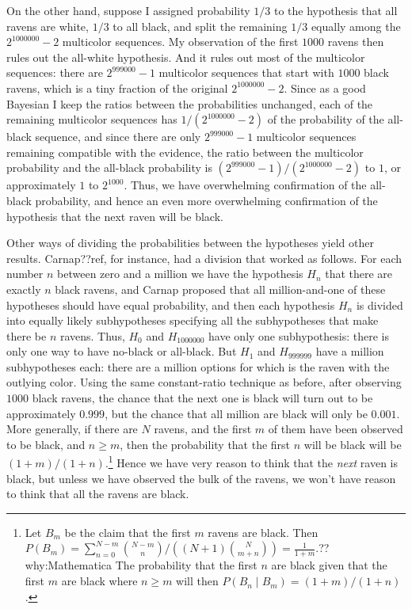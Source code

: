 On the other hand, suppose I assigned probability $1/3$ to the hypothesis that all ravens are white, $1/3$ to all black,
and split the remaining $1/3$ equally among the $2^{1000000}-2$ multicolor sequences. My observation of the first $1000$
ravens then rules out the all-white  hypothesis. And it rules out most of the multicolor sequences: there are $2^{999000}-1$
multicolor sequences that start with $1000$ black ravens, which is a tiny fraction of the original $2^{1000000}-2$. Since as a 
good Bayesian I keep the ratios between the probabilities unchanged, each of the remaining multicolor sequences has 
$1/(2^{1000000}-2)$ of the probability of the all-black sequence, and since there are only $2^{999000}-1$ multicolor
sequences remaining compatible with the evidence, the ratio between the multicolor probability and the all-black probability
is $(2^{999000}-1)/(2^{1000000}-2)$ to $1$, or approximately $1$ to $2^{1000}$. Thus, we have overwhelming confirmation of 
the all-black probability, and hence an even more overwhelming confirmation of the hypothesis that the next raven will be black.

Other ways of dividing the probabilities between the hypotheses yield other results. Carnap??ref, for instance, had a division
that worked as follows. For each number $n$ between zero and a million we have the hypothesis $H_n$ that there are exactly 
$n$ black ravens, and Carnap proposed that all million-and-one of these hypotheses should have equal probability, and then 
each hypothesis $H_n$ is divided into equally likely subhypotheses specifying all the subhypotheses that make there be $n$
ravens. Thus, $H_0$ and $H_{1000000}$ have only one subhypothesis: there is only one way to have no-black or all-black. But
$H_1$ and $H_{999999}$ have a million subhypotheses each: there are a million options for which is the raven with the outlying
color. Using the same constant-ratio technique as before, after observing $1000$ black ravens, the chance that the next one is black 
will turn out to be approximately $0.999$, but the chance that all million are black will only be $0.001$. More generally, if there
are $N$ ravens, and the first $m$ of them have been observed to be black, and $n\ge m$, then the probability that the first $n$
will be black will be $(1+m)/(1+n)$.\footnote{Let $B_m$ be the claim that the first $m$ ravens are black. Then
$P(B_m)=\sum_{n=0}^{N-m} {{N-m \choose n}}/((N+1){N\choose m+n}) = \frac{1}{1+m}$.??why:Mathematica The probability that the first
$n$ are black given that the first $m$ are black where $n\ge m$ will then $P(B_n\mid B_m)=(1+m)/(1+n)$.} 
  Hence we have very reason to think that the \textit{next} raven is black,
but unless we have observed the bulk of the ravens, we won't have reason to think that all the ravens are black. 

